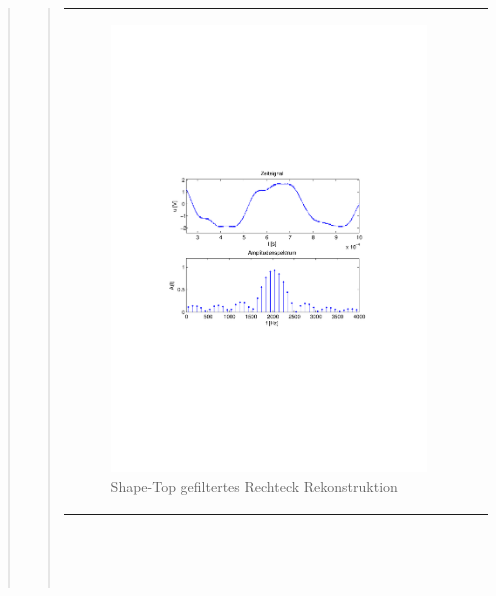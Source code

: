 \begin{quote}
\begin{quote}
\begin{center}
\begin{tabular}{ll}
                \begin{minipage}{0.6\textwidth}
                    \begin{figure}[H]
                        \includegraphics[scale=0.55, trim = 16mm 70mm 16mm 85mm, clip]{Bilder/shaperecFil20_05}
                       \caption{Shape-Top gefiltertes Rechteck Rekonstruktion}
		              \label{fig:shaperecFil20_05}
                    \end{figure}
                \end{minipage}
            
            \end{tabular}
            \end{center}
       \ \\
       \ \\
       \ \\
            

\end{quote}
\end{quote}
